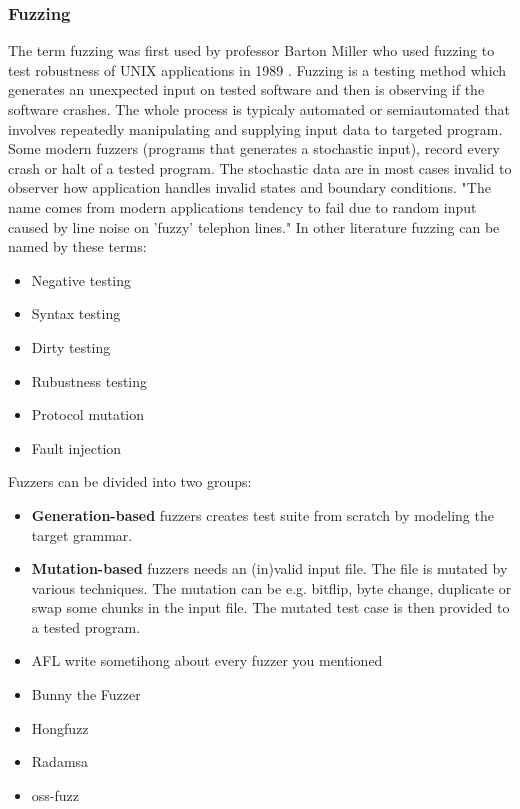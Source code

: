 \subsubsection{Fuzzing}
\label{fuzzing}
The term fuzzing was first used by professor Barton Miller who used fuzzing to test robustness of UNIX applications in 1989 \cite{Takanen:2008:FSS:1404500, Marhefka2013}.
Fuzzing is a testing method which generates an unexpected input on tested software and then is observing if the software crashes. The whole process is
typicaly automated or semiautomated that involves repeatedly manipulating and supplying input data to targeted program.
Some modern fuzzers (programs that generates a stochastic input), record every crash or halt of a tested program.
The stochastic data are in most cases invalid to observer how application handles invalid
states and boundary conditions.
"The name comes from modern applications tendency to fail due to random input caused by line noise on 'fuzzy' telephon lines."\cite{Takanen:2008:FSS:1404500, N2LYDLnqzEFYp0wM}
In other literature fuzzing can be named by these terms:
\begin{itemize}
	\item Negative testing
	\item Syntax testing
	\item Dirty testing
	\item Rubustness testing
	\item Protocol mutation
	\item Fault injection
\end{itemize}

Fuzzers can be divided into two groups:
\begin{itemize}
	\item \textbf{Generation-based} fuzzers creates test suite from scratch by modeling the target grammar.
	\item \textbf{Mutation-based} fuzzers needs an (in)valid input file. The file is mutated by various techniques.
	The mutation can be e.g. bitflip, byte change, duplicate or swap some chunks in the input file.
	The mutated test case is then provided to a tested program.
\end{itemize}

\begin{itemize}
	\item{AFL} write sometihong about every fuzzer you mentioned
	\item{Bunny the Fuzzer}
	\item{Hongfuzz}
	\item{Radamsa}
	\item{oss-fuzz}
\end{itemize}
